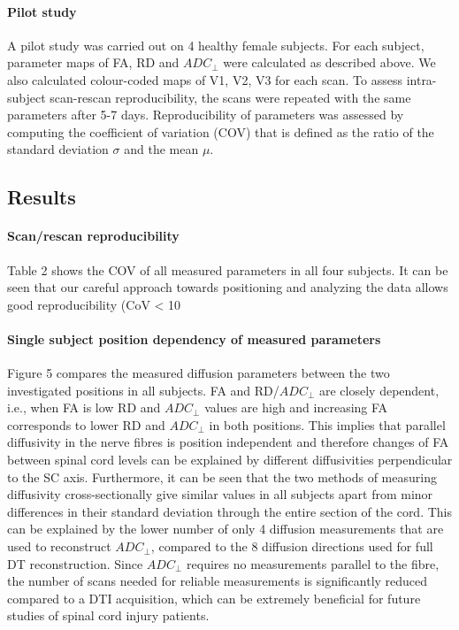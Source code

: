 \paragraph{Pilot study}
A pilot study was carried out on 4 healthy female subjects. For each subject, parameter maps of FA, RD and $ADC_\perp$ were calculated as described above. We also calculated colour-coded maps of V1, V2, V3 for each scan. To assess intra-subject scan-rescan reproducibility, the scans were repeated with the same parameters after 5-7 days. Reproducibility of parameters was assessed by computing the coefficient of variation (COV) that is defined as the ratio of the standard deviation $\sigma$ and the mean $\mu$.

\subsection*{Results}
\paragraph{Scan/rescan reproducibility}
Table 2 shows the COV of all measured parameters in all four subjects. It can be seen that our careful approach towards positioning and analyzing the data allows good reproducibility (CoV < 10%

\paragraph{Single subject position dependency of measured parameters}
Figure 5 compares the measured diffusion parameters between the two investigated positions in all subjects. FA and RD/$ADC_\perp$ are closely dependent, i.e., when FA is low RD and $ADC_\perp$ values are high and increasing FA corresponds to lower RD and $ADC_\perp$ in both positions. This implies that parallel diffusivity in the nerve fibres is position independent and therefore changes of FA between spinal cord levels can be explained by different diffusivities perpendicular to the SC axis. Furthermore, it can be seen that the two methods of measuring diffusivity cross-sectionally give similar values in all subjects apart from minor differences in their standard deviation through the entire section of the cord. This can be explained by the lower number of only 4 diffusion measurements that are used to reconstruct $ADC_\perp$, compared to the 8 diffusion directions used for full DT reconstruction. Since $ADC_\perp$ requires no measurements parallel to the fibre, the number of scans needed for reliable measurements is significantly reduced compared to a DTI acquisition, which can be extremely beneficial for future studies of spinal cord injury patients. 
